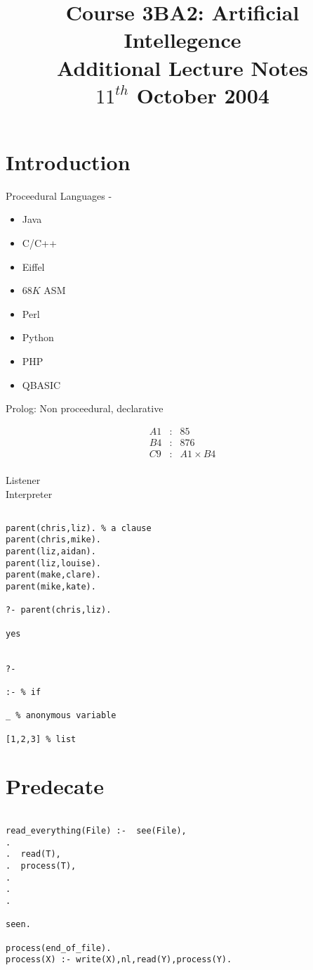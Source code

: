 \documentclass[a4paper,12pt]{article}
\begin{document}
\title{Course 3BA2: Artificial Intellegence \\ Additional Lecture Notes \\ $11^{th}$ October 2004}

\maketitle

\section{Introduction}

Proceedural Languages - 

\begin{itemize}
\item Java
\item C/C++
\item Eiffel
\item $68K$ ASM
\item Perl
\item Python
\item PHP
\item QBASIC
\end{itemize}

Prolog: Non proceedural, declarative

\begin{eqnarray*}
A1 & : & 85 \\
B4 & : & 876 \\
C9 & : & A1 \times B4 \\
\end{eqnarray*}


Listener \\

Interpreter \\
 

\begin{verbatim}

parent(chris,liz). % a clause
parent(chris,mike).
parent(liz,aidan).
parent(liz,louise).
parent(make,clare).
parent(mike,kate).

?- parent(chris,liz).

yes


?-

:- % if

_ % anonymous variable

[1,2,3] % list

\end{verbatim}

\section{Predecate}


\begin{verbatim}

read_everything(File) :-  see(File),
.  
.  read(T),
.  process(T),
. 
. 
. 

seen.

process(end_of_file).
process(X) :- write(X),nl,read(Y),process(Y).

\end{verbatim}
\end{document}
